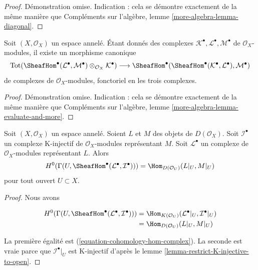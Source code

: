 \begin{proof}
Démonstration omise. Indication : cela se démontre exactement de la même manière que Compléments sur l'algèbre, lemme \ref{more-algebra-lemma-diagonal}.
\end{proof}

\begin{lemma}

\label{lemma-evaluate-and-more}

Soit $(X, \mathcal{O}_X)$ un espace annelé. Étant donnés des complexes
$\mathcal{K}^\bullet, \mathcal{L}^\bullet, \mathcal{M}^\bullet$
de $\mathcal{O}_X$-modules, il existe un morphisme canonique
$$
\text{Tot}(\SheafHom^\bullet(\mathcal{L}^\bullet,
\mathcal{M}^\bullet) \otimes_{\mathcal{O}_X} \mathcal{K}^\bullet)
\longrightarrow
\SheafHom^\bullet(\SheafHom^\bullet(\mathcal{K}^\bullet,
\mathcal{L}^\bullet), \mathcal{M}^\bullet)
$$
de complexes de $\mathcal{O}_X$-modules, fonctoriel en les trois complexes.

\end{lemma}

\begin{proof}
Démonstration omise. Indication : cela se démontre exactement de la même manière que Compléments sur l'algèbre, lemme \ref{more-algebra-lemma-evaluate-and-more}.
\end{proof}

\begin{lemma}

\label{lemma-RHom-into-K-injective}
Soit $(X, \mathcal{O}_X)$ un espace annelé. Soient $L$ et $M$ des objets de $D(\mathcal{O}_X)$. Soit $\mathcal{I}^\bullet$ un complexe K-injectif de $\mathcal{O}_X$-modules représentant $M$. Soit $\mathcal{L}^\bullet$ un complexe de $\mathcal{O}_X$-modules représentant $L$. Alors $$
H^0(\Gamma(U, \SheafHom^\bullet(\mathcal{L}^\bullet, \mathcal{I}^\bullet))) =
\Hom_{D(\mathcal{O}_U)}(L|_U, M|_U)
$$ pour tout ouvert $U \subset X$.
\end{lemma}

\begin{proof}

Nous avons

\begin{align*}
H^0(\Gamma(U, \SheafHom^\bullet(\mathcal{L}^\bullet, \mathcal{I}^\bullet)))
& =
\Hom_{K(\mathcal{O}_U)}(\mathcal{L}^\bullet|_U, \mathcal{I}^\bullet|_U) \\
& =
\Hom_{D(\mathcal{O}_U)}(L|_U, M|_U)
\end{align*}

La première égalité est (\ref{equation-cohomology-hom-complex}). La seconde est vraie parce que $\mathcal{I}^\bullet|_U$
est K-injectif d'après le lemme \ref{lemma-restrict-K-injective-to-open}.

\end{proof}

